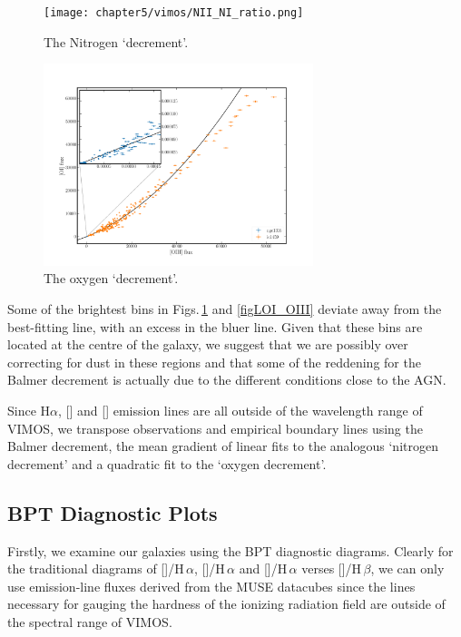 		\begin{figure}
			\centering
			\texttt{[image: chapter5/vimos/NII\_NI\_ratio.png]}
			\caption[The nitrogen `decrement']{The Nitrogen `decrement'.} 
			\label{fig:NII_NI}
		\end{figure}

		\begin{figure}
			\centering
			\includegraphics[width=0.7\textwidth]{chapter5/OIII_OI_ratio.png}
			\caption[The oxygen `decrement']{The oxygen `decrement'.} 
			\label{fig:OI_OIII}
		\end{figure}


		Some of the brightest bins in Figs.\,\ref{fig:NII_NI} and \ref{figLOI_OIII} deviate away from the best-fitting line, with an excess in the bluer line. Given that these bins are located at the centre of the galaxy, we suggest that we are possibly over correcting for dust in these regions and that some of the reddening for the Balmer decrement is actually due to the different conditions close to the AGN. 



		Since H$\alpha$, [] and [] emission lines are all outside of the wavelength range of VIMOS, we transpose observations and empirical boundary lines  
		using the Balmer decrement, the mean gradient of linear fits to the analogous `nitrogen decrement' and a quadratic fit to the `oxygen decrement'.

	\subsection{BPT Diagnostic Plots}
		\label{subsec:BPT}
		Firstly, we examine our galaxies using the BPT diagnostic diagrams. Clearly for the traditional diagrams of []/H\,$\alpha$, []/H\,$\alpha$ and []/H\,$\alpha$ verses []/H\,$\beta$, we can only use emission-line fluxes derived from the MUSE datacubes since the lines necessary for gauging the hardness of the ionizing radiation field are outside of the spectral range of VIMOS. 


